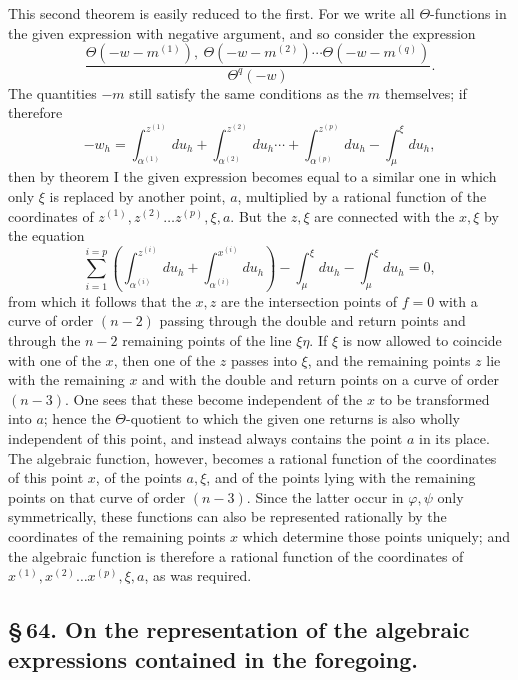 \documentclass[10pt]{article}
\begin{document}
This second theorem is easily reduced to the first. For we write all \(\Theta\)-functions in the given expression with negative argument, and so consider the expression
\[
\frac{\Theta(-w-m^{(1)}),\ \Theta(-w-m^{(2)})\cdots\Theta(-w-m^{(q)})}{\Theta^{q}(-w)}.
\]
The quantities \(-m\) still satisfy the same conditions as the \(m\) themselves; if therefore
\[
-w_h=\int_{\alpha^{(1)}}^{z^{(1)}}du_h+
\int_{\alpha^{(2)}}^{z^{(2)}}du_h\cdots+
\int_{\alpha^{(p)}}^{z^{(p)}}du_h-
\int_{\mu}^{\xi}du_h,
\]
then by theorem I the given expression becomes equal to a similar one in which only \(\xi\) is replaced by another point, \(a\), multiplied by a rational function of the coordinates of \(z^{(1)},z^{(2)}\ldots z^{(p)},\xi,a\). But the \(z,\xi\) are connected with the \(x,\xi\) by the equation
\[
\sum_{i=1}^{i=p}\left(\int_{\alpha^{(i)}}^{z^{(i)}}du_h+
\int_{\alpha^{(i)}}^{x^{(i)}}du_h\right)-
\int_{\mu}^{\xi}du_h-\int_{\mu}^{\xi}du_h=0,
\]
from which it follows that the \(x,z\) are the intersection points of \(f=0\) with a curve of order \((n-2)\) passing through the double and return points and through the \(n-2\) remaining points of the line \(\xi\eta\). If \(\xi\) is now allowed to coincide with one of the \(x\), then one of the \(z\) passes into \(\xi\), and the remaining points \(z\) lie with the remaining \(x\) and with the double and return points on a curve of order \((n-3)\). One sees that these become independent of the \(x\) to be transformed into \(a\); hence the \(\Theta\)-quotient to which the given one returns is also wholly independent of this point, and instead always contains the point \(a\) in its place. The algebraic function, however, becomes a rational function of the coordinates of this point \(x\), of the points \(a,\xi\), and of the points lying with the remaining points on that curve of order \((n-3)\). Since the latter occur in \(\varphi,\psi\) only symmetrically, these functions can also be represented rationally by the coordinates of the remaining points \(x\) which determine those points uniquely; and the algebraic function is therefore a rational function of the coordinates of \(x^{(1)},x^{(2)}\ldots x^{(p)},\xi,a\), as was required.

\clearpage

\subsection*{\S\,64. On the representation of the algebraic expressions contained in the foregoing.}
\end{document}
